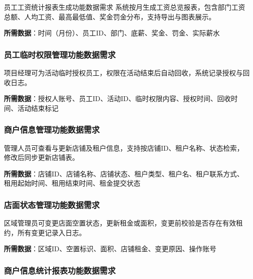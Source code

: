 \documentclass[]{article}
\begin{document}
员工工资统计报表生成功能数据需求
系统按月生成工资总览报表，包含部门工资总额、人均工资、最高最低值、奖金罚金分布，支持导出与图表展示。

\textbf{所需数据}：时间（月份）、员工ID、部门、底薪、奖金、罚金、实际薪水

\hypertarget{ux5458ux5de5ux4e34ux65f6ux6743ux9650ux7ba1ux7406ux529fux80fdux6570ux636eux9700ux6c42}{%
\subsubsection{员工临时权限管理功能数据需求}\label{ux5458ux5de5ux4e34ux65f6ux6743ux9650ux7ba1ux7406ux529fux80fdux6570ux636eux9700ux6c42}}

项目经理可为活动临时授权员工，权限在活动结束后自动回收，系统记录授权与回收日志。

\textbf{所需数据}：授权人账号、员工ID、活动ID、临时权限内容、授权时间、回收时间、活动结束标记

\hypertarget{ux5546ux6237ux4fe1ux606fux7ba1ux7406ux529fux80fdux6570ux636eux9700ux6c42}{%
\subsubsection{商户信息管理功能数据需求}\label{ux5546ux6237ux4fe1ux606fux7ba1ux7406ux529fux80fdux6570ux636eux9700ux6c42}}

管理人员可查看与更新店铺及租户信息，支持按店铺ID、租户名称、状态检索，修改后同步更新店铺表。

\textbf{所需数据}：店铺ID、店铺名称、店铺状态、租户类型、租户名、租户联系方式、租用起始时间、租用结束时间、租金提交状态

\hypertarget{ux5e97ux9762ux72b6ux6001ux7ba1ux7406ux529fux80fdux6570ux636eux9700ux6c42}{%
\subsubsection{店面状态管理功能数据需求}\label{ux5e97ux9762ux72b6ux6001ux7ba1ux7406ux529fux80fdux6570ux636eux9700ux6c42}}

区域管理员可变更店面空置状态，更新租金或面积，变更前校验是否存在有效租约，所有变更记录入日志。

\textbf{所需数据}：区域ID、空置标识、面积、店铺租金、变更原因、操作账号

\hypertarget{ux5546ux6237ux4fe1ux606fux7edfux8ba1ux62a5ux8868ux529fux80fdux6570ux636eux9700ux6c42}{%
\subsubsection{商户信息统计报表功能数据需求}\label{ux5546ux6237ux4fe1ux606fux7edfux8ba1ux62a5ux8868ux529fux80fdux6570ux636eux9700ux6c42}}
\end{document}
